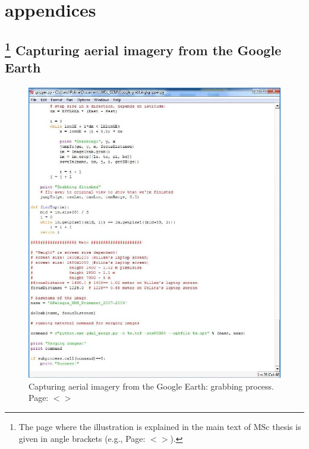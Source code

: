 \documentclass[11pt]{article}
\begin{document}
\begin{appendices}
\appendix \label{app}
\appendixpage
{}

\section{appendices}\label{app}
\subsection{\footnote{The page where the illustration is explained in the main text of MSc thesis is given in angle brackets (e.g., Page: $<$\pageref{page-40}$>$).} Capturing aerial imagery from the Google Earth}

\begin{figure}[H]
	\centering
	\includegraphics[scale=0.55]{Fig-22.jpg}
	\caption{Capturing aerial imagery from the Google Earth: grabbing process. Page: $<$\pageref{gdal}$>$}\label{fig:A.1}
\end{figure}
\pagebreak


\end{appendices}
\end{document}
